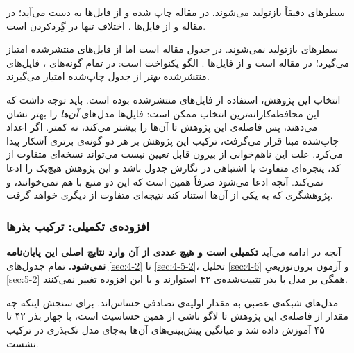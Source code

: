 سطرهای  دقیقاً بازتولید می‌شوند.  در مقاله 
چاپ شده و از فایل‌ها  به دست می‌آید؛  در مقاله  و از
فایل‌ها . اختلاف تنها در گِرد‌کردن است.

سطرهای  بازتولید نمی‌شوند.  در جدول مقاله 
است اما از فایل‌های منتشرشده  امتیاز می‌گیرد؛  در مقاله
 است و از فایل‌ها . الگو یکنواخت است: در تمام گونه‌های
، فایل‌های منتشرشده \emph{بهتر} از جدول چاپ‌شده امتیاز می‌گیرند.

انتخاب این پژوهش، استفاده از فایل‌های منتشرشده بوده است. باید توجه داشت که این
محافظه‌کارانه‌ترین انتخاب ممکن است: فایل‌ها مدل‌های \emph{آن‌ها} را بهتر نشان
می‌دهند، پس فاصله‌ی این پژوهش تا آن‌ها را بیشتر می‌کند، نه کمتر. اگر اعداد چاپ‌شده
مبنا قرار می‌گرفت، ترکیب این پژوهش بر هر دو گونه‌ی  برتری آشکار پیدا
می‌کرد. علت این ناهم‌خوانی از بیرون قابل تعیین نیست  می‌تواند نسخه‌ای متفاوت
از کد، پنجره‌ای متفاوت یا اشتباهی در نگارش جدول باشد  و این پژوهش هیچ‌یک را
ادعا نمی‌کند. آنچه ادعا می‌شود صرفاً همین است که این دو منبع با هم نمی‌خوانند، و
پژوهشگری که به یکی از آن‌ها استناد کند نتیجه‌ای متفاوت از دیگری خواهد گرفت.

\subsubsection*{افزوده‌ی تکمیلی: ترکیب بذرها}

آنچه در ادامه می‌آید \textbf{تکمیلی است و هیچ عددی از آن وارد نتایج اصلی این
پایان‌نامه نمی‌شود.} تمام جدول‌های \cref{sec:4-2} تا \cref{sec:4-5-2}، تحلیل
\cref{sec:4-6} و آزمون برون‌توزیعیِ \cref{sec:5-2} همگی بر مدل  با بذر
تثبیت‌شده‌ی ۴۲ استوارند و با این افزوده تغییر نمی‌کنند.

مدل‌های شبکه‌ی عصبی به مقدار اولیه‌ی تصادفی حساس‌اند. برای سنجش اینکه چه مقدار از
فاصله‌ی این پژوهش تا لاگو ناشی از همین حساسیت است،  با چهار بذر ۴۲ تا ۴۵
آموزش داده شد و میانگین پیش‌بینی‌های آن‌ها به‌جای مدل تک‌بذری در ترکیب نشست.


